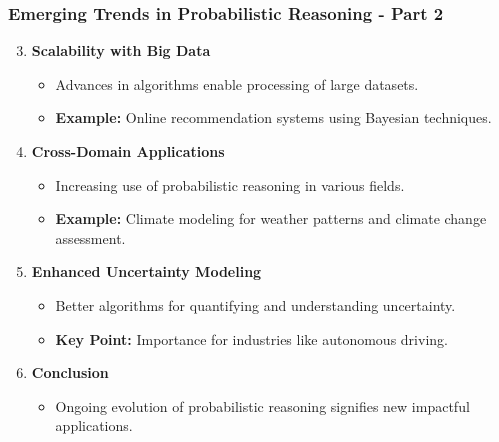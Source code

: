 \documentclass[aspectratio=169]{beamer}
\begin{document}
\begin{frame}[fragile]
    \frametitle{Emerging Trends in Probabilistic Reasoning - Part 2}
    \begin{enumerate}
        \setcounter{enumi}{2}
        \item \textbf{Scalability with Big Data}
            \begin{itemize}
                \item Advances in algorithms enable processing of large datasets.
                \item \textbf{Example:} Online recommendation systems using Bayesian techniques.
            \end{itemize}

        \item \textbf{Cross-Domain Applications}
            \begin{itemize}
                \item Increasing use of probabilistic reasoning in various fields.
                \item \textbf{Example:} Climate modeling for weather patterns and climate change assessment.
            \end{itemize}

        \item \textbf{Enhanced Uncertainty Modeling}
            \begin{itemize}
                \item Better algorithms for quantifying and understanding uncertainty.
                \item \textbf{Key Point:} Importance for industries like autonomous driving.
            \end{itemize}
        
        \item \textbf{Conclusion}
            \begin{itemize}
                \item Ongoing evolution of probabilistic reasoning signifies new impactful applications.
            \end{itemize}
    \end{enumerate}
\end{frame}
\end{document}
